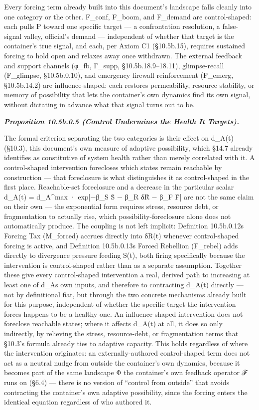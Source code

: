 \documentclass[
]{article}
\begin{document}
Every forcing term already built into this document's landscape falls
cleanly into one category or the other. F\_conf, F\_boom, and F\_demand
are control-shaped: each pulls P toward one specific target --- a
confrontation resolution, a false-signal valley, official's demand ---
independent of whether that target is the container's true signal, and
each, per Axiom C1 (§10.5b.15), requires sustained forcing to hold open
and relaxes away once withdrawn. The external feedback and support
channels (φ\_fb, Γ\_supp, §10.5b.18.9--18.11), glimpse-recall
(F\_glimpse, §10.5b.0.10), and emergency firewall reinforcement
(F\_emerg, §10.5b.14.2) are influence-shaped: each restores
permeability, resource stability, or memory of possibility that lets the
container's own dynamics find its own signal, without dictating in
advance what that signal turns out to be.

\emph{\textbf{Proposition 10.5b.0.5 (Control Undermines the Health It
Targets).}}

The formal criterion separating the two categories is their effect on
d\_A(t) (§10.3), this document's own measure of adaptive possibility,
which §14.7 already identifies as constitutive of system health rather
than merely correlated with it. A control-shaped intervention forecloses
which states remain reachable by construction --- that foreclosure is
what distinguishes it as control-shaped in the first place.
Reachable-set foreclosure and a decrease in the particular scalar
d\_A(t) = d\_A\^{}max · exp{[}−β\_S S̃ − β\_R δR̃ − β\_F F̃{]} are not the
same claim on their own --- the exponential form requires stress,
resource debt, or fragmentation to actually rise, which
possibility-foreclosure alone does not automatically produce. The
coupling is not left implicit: Definition 10.5b.0.12s Forcing Tax
(M\_forced) accrues directly into δR(t) whenever control-shaped forcing
is active, and Definition 10.5b.0.13s Forced Rebellion (F\_rebel) adds
directly to divergence pressure feeding S(t), both firing specifically
because the intervention is control-shaped rather than as a separate
assumption. Together these give every control-shaped intervention a
real, derived path to increasing at least one of d\_As own inputs, and
therefore to contracting d\_A(t) directly --- not by definitional fiat,
but through the two concrete mechanisms already built for this purpose,
independent of whether the specific target the intervention forces
happens to be a healthy one. An influence-shaped intervention does not
foreclose reachable states; where it affects d\_A(t) at all, it does so
only indirectly, by relieving the stress, resource-debt, or
fragmentation terms that §10.3's formula already ties to adaptive
capacity. This holds regardless of where the intervention originates: an
externally-authored control-shaped term does not act as a neutral nudge
from outside the container's own dynamics, because it becomes part of
the same landscape Φ the container's own feedback operator ℱ runs on
(§6.4) --- there is no version of ``control from outside'' that avoids
contracting the container's own adaptive possibility, since the forcing
enters the identical equation regardless of who authored it.
\end{document}
